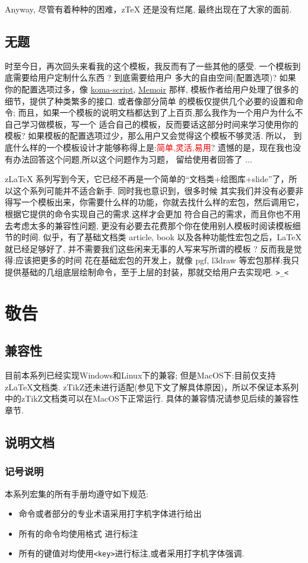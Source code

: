\documentclass[
  hyper,    
  lang=cn,
  class=book,
  mathSpec={envStyle=leftbar, alias},
  toc={redef}
]{zlatex}
\let\cmd\zlatexVerb
\newcommand{\zkey}[1]{\texttt{<#1>}}
\begin{document}
Anyway, 尽管有着种种的困难，z\TeX{} 还是没有烂尾, 最终出现在了大家的面前. 

\section{无题}
时至今日，再次回头来看我的这个模板，我反而有了一些其他的感受. 一个模板到底需要给用户定制什么东西 ? 到底需要给用户
多大的自由空间(配置选项)? 如果你的配置选项过多，像 \href{https://www.ctan.org/pkg/koma-script}{koma-script}, 
\href{https://ctan.org/pkg/memoir}{Memoir} 那样, 模板作者给用户处理了很多的细节，提供了种类繁多的接口. 或者像部分简单
的模板仅提供几个必要的设置和命令; 而且，如果一个模板的说明文档都达到了上百页,那么我作为一个用户为什么不自己学习做模板，写一个
适合自己的模板，反而要话这部分时间来学习使用你的模板? 如果模板的配置选项过少，那么用户又会觉得这个模板不够灵活. 所以，
到底什么样的一个模板设计才能够称得上是:\textcolor{red}{简单,灵活,易用}? 遗憾的是，现在我也没有办法回答这个问题,所以这个问题作为习题，
留给使用者回答了 ...

z\LaTeX{} 系列写到今天，它已经不再是一个简单的``文档类+绘图库+slide''了，所以这个系列可能并不适合新手. 同时我也意识到，很多时候
其实我们并没有必要非得写一个模板出来，你需要什么样的功能，你就去找什么样的宏包，然后调用它，根据它提供的命令实现自己的需求.这样才会更加
符合自己的需求，而且你也不用去考虑太多的兼容性问题, 更没有必要去花费那个你在使用别人模板时阅读模板细节的时间. 似乎，有了基础文档类 
article, book 以及各种功能性宏包之后，\LaTeX{}就已经足够好了, 并不需要我们这些闲来无事的人写来写所谓的模板 ? 反而我是觉得:应该把更多的时间
花在基础宏包的开发上，就像 pgf, l3draw 等宏包那样:我只提供基础的几组底层绘制命令，至于上层的封装，那就交给用户去实现吧. \texttt{>\_<}


\chapter{敬告}
\section{兼容性}
目前本系列已经实现Windows和Linux下的兼容; 但是MacOS下:目前仅支持z\LaTeX{}文档类.
zTikZ还未进行适配(参见下文了解具体原因)，所以不保证本系列中的zTikZ文档类可以在MacOS下正常运行.
具体的兼容情况请参见后续的兼容性章节.

\section{说明文档}
\subsection{记号说明}
本系列宏集的所有手册均遵守如下规范:
\begin{itemize}
  \item 命令或者部分的专业术语采用打字机字体进行给出
  \item 所有的命令均使用格式 \cmd{\cmd}进行标注
  \item 所有的键值对均使用\zkey{key}进行标注,或者采用打字机字体强调.
\end{itemize}
\end{document}
